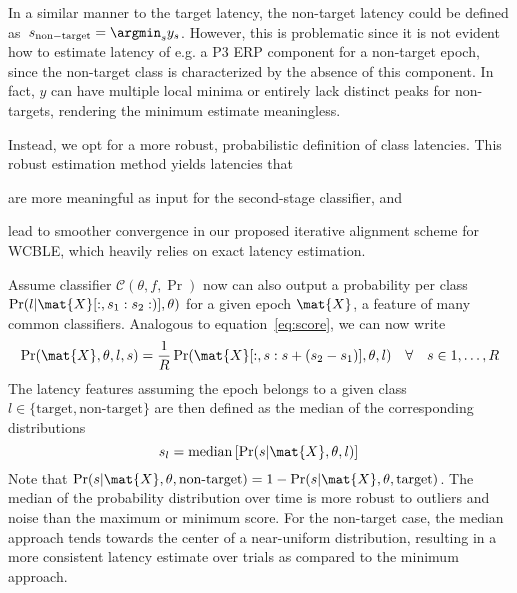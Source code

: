 In a similar manner to the target latency, the non-target latency could be defined
as~$s_\mathrm{non-target}=\argmin_s{y_s}$.
However, this is problematic since it is not evident how to estimate
latency of e.g. a P3 ERP component for a non-target epoch, since the
non-target class is characterized by the absence of this component.
In fact, $y$ can have multiple local minima or entirely lack distinct peaks for
non-targets, rendering the minimum estimate meaningless.

Instead, we opt for a more robust, probabilistic definition of class latencies.
This robust estimation method yields latencies that
\begin{enumerate*}[label=(\arabic*)]
  \item are more meaningful as input for the second-stage
    classifier, and
  \item lead to smoother convergence in our proposed iterative alignment scheme
    for WCBLE, which heavily relies on exact latency estimation.
\end{enumerate*}
Assume classifier $\mathcal{C}(\theta,f,\Pr)$ now can also output a probability
per class $\Pr(l|
\mat{X}[:,s_1:s_2:)], \theta)$ for a given epoch $\mat{X}$, a feature of many
common classifiers.
Analogous to equation~\ref{eq:score}, we can now write
\begin{equation}
\Pr(\mat{X},\theta,l,s) = \frac{1}{R}\Pr(\mat{X}[:,s:s+(s_2-s_1)],\theta,l)
  \quad \forall \quad s\in 1,\ldots,R
	\label{eq:prob}
\end{equation}
The latency features assuming the epoch belongs to a given class
$l\in\{\textrm{target},\textrm{non-target}\}$ are then defined as the median of
the corresponding  distributions
\begin{equation}
  s_l =\mathrm{median}\left[\Pr(s|\mat{X},\theta,l) \right] \\
  \label{eq:prob-latency}
\end{equation}
Note that $  \Pr(s|\mat{X},\theta,\textrm{non-target}) =1-
  \Pr(s|\mat{X},\theta,\mathrm{target})$.
The median of the probability distribution over time is more robust to
outliers and noise than the maximum or minimum score.
For the non-target case, the median approach tends towards the center of a
near-uniform distribution, resulting in a more consistent latency estimate over
trials as compared to the minimum approach.


